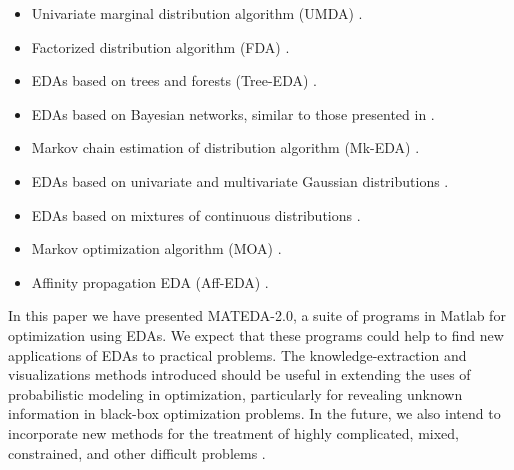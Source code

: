 \documentclass[a4paper]{article}
\begin{document}
\begin{itemize}
  \item Univariate marginal distribution algorithm (UMDA)
  \cite{Muhlenbein_and_Paas:1996}.
  \item Factorized distribution algorithm (FDA)
  \cite{Muhlenbein_et_al:1999}.
  \item EDAs based on trees and forests (Tree-EDA) \cite{Baluja_and_Davies:1997,Pelikan_and_Muhlenbein:1999,Santana_et_al:2001br}.
  \item EDAs based on Bayesian networks, similar to those presented
  in \cite{Etxeberria_and_Larranhaga:1999,Muehlenbein_and_Mahnig:2001a,Pelikan_et_al:1999}.
  \item Markov chain estimation of distribution algorithm (Mk-EDA)
  \cite{Santana_et_al:2004}.
  \item EDAs based on univariate and multivariate Gaussian distributions \cite{Bosman_and_Thierens:2000,Bosman_and_Thierens:2000a,Larranhaga_et_al:1999,Larranhaga_et_al:2000}.
  \item EDAs based on mixtures of continuous distributions \cite{Bosman_and_Thierens:2002}.
  \item Markov optimization algorithm (MOA)  \cite{Shakya_and_Santana:2008}.
  \item Affinity propagation EDA (Aff-EDA)  \cite{Santana_et_al:2008}.
\end{itemize}


In this paper we have presented MATEDA-2.0, a suite of programs in Matlab for optimization using EDAs.
We expect that these programs could help to find new applications of EDAs
to practical problems. The knowledge-extraction and visualizations methods introduced should
be useful in extending
 the uses of probabilistic modeling in optimization, particularly for revealing
 unknown information in black-box optimization problems.  In the future, we also intend
to incorporate new methods for the treatment of highly complicated, mixed, constrained, and other
 difficult problems \cite{Santana_et_al:2009b}.




\end{document}
